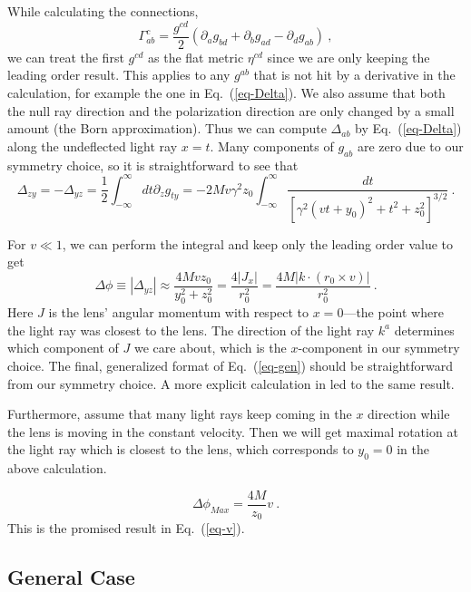 \documentclass[aps,showpacs,onecolumn,floats,prd,superscriptaddress,nofootinbib]{revtex4}
\begin{document}
While calculating the connections,
\begin{equation}
\Gamma_{ab}^c = \frac{g^{cd}}{2}\left(\partial_a g_{bd} + \partial_b g_{ad} - \partial_d g_{ab} \right)~,
\end{equation}
we can treat the first $g^{cd}$ as the flat metric $\eta^{cd}$ since we are only keeping the leading order result. 
This applies to any $g^{ab}$ that is not hit by a derivative in the calculation, for example the one in Eq.~(\ref{eq-Delta}).
We also assume that both the null ray direction and the polarization direction are only changed by a small amount (the Born approximation). 
Thus we can compute $\Delta_{ab}$ by Eq.~(\ref{eq-Delta}) along the undeflected light ray $x=t$.
Many components of $g_{ab}$ are zero due to our symmetry choice, so it is straightforward to see that
\begin{equation}
\Delta_{zy} = -\Delta_{yz} = \frac{1}{2}\int_{-\infty}^{\infty} dt \partial_z g_{ty}
=-2Mv\gamma^2 z_0 \int_{-\infty}^{\infty}
\frac{dt}{\left[\gamma^2(vt+y_0)^2+t^2 + z_0^2\right]^{3/2}}~.
\end{equation}

For $v\ll1$, we can perform the integral and keep only the leading order value to get 
\begin{equation}
\Delta\phi \equiv |\Delta_{yz}| \approx \frac{4Mvz_0}{y_0^2 + z_0^2}
= \frac{4|J_x|}{r_0^2}
= \frac{4 M |k\cdot(r_0\times v)|}{r_0^2}~.
\label{eq-gen}
\end{equation}
Here $J$ is the lens' angular momentum with respect to $x=0$---the point where the light ray was closest to the lens.
The direction of the light ray $k^a$ determines which component of $J$ we care about, which is the $x$-component in our symmetry choice.
The final, generalized format of Eq.~(\ref{eq-gen}) should be straightforward from our symmetry choice.
A more explicit calculation in \cite{KopMas01} led to the same result.

Furthermore, assume that many light rays keep coming in the $x$ direction while the lens is moving in the constant velocity.
Then we will get maximal rotation at the light ray which is closest to the lens, which corresponds to $y_0=0$ in the above calculation.

\begin{equation}
\Delta \phi_{Max} = \frac{4M}{z_0}v ~.
\end{equation}
This is the promised result in Eq.~(\ref{eq-v}).

\subsection{General Case}
\end{document}
